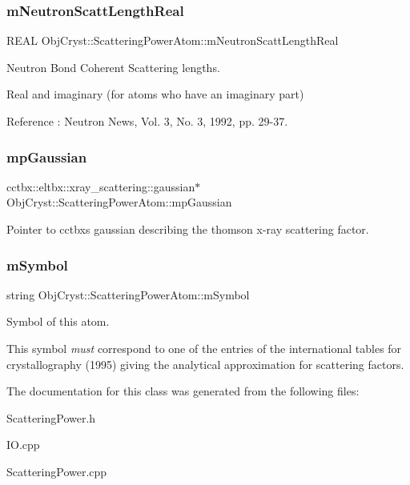 \subsubsection{\texorpdfstring{mNeutronScattLengthReal}{mNeutronScattLengthReal}}
{\footnotesize\ttfamily R\+E\+AL Obj\+Cryst\+::\+Scattering\+Power\+Atom\+::m\+Neutron\+Scatt\+Length\+Real\hspace{0.3cm}{\ttfamily [protected]}}



Neutron Bond Coherent Scattering lengths. 

Real and imaginary (for atoms who have an imaginary part)

Reference \+: Neutron News, Vol. 3, No. 3, 1992, pp. 29-\/37. \mbox{\label{class_obj_cryst_1_1_scattering_power_atom_af5837e83fd8027adcaecde3a5fbb22f2}} 
\subsubsection{\texorpdfstring{mpGaussian}{mpGaussian}}
{\footnotesize\ttfamily cctbx\+::eltbx\+::xray\+\_\+scattering\+::gaussian$\ast$ Obj\+Cryst\+::\+Scattering\+Power\+Atom\+::mp\+Gaussian\hspace{0.3cm}{\ttfamily [protected]}}

Pointer to cctbx\textquotesingle{}s gaussian describing the thomson x-\/ray scattering factor. \mbox{\label{class_obj_cryst_1_1_scattering_power_atom_a8716898711ea10436334ec4a970c32a6}} 
\subsubsection{\texorpdfstring{mSymbol}{mSymbol}}
{\footnotesize\ttfamily string Obj\+Cryst\+::\+Scattering\+Power\+Atom\+::m\+Symbol\hspace{0.3cm}{\ttfamily [protected]}}



Symbol of this atom. 

This symbol {\itshape must} correspond to one of the entries of the international tables for crystallography (1995) giving the analytical approximation for scattering factors. 

The documentation for this class was generated from the following files\+:\begin{DoxyCompactItemize}
\item 
Scattering\+Power.\+h\item 
I\+O.\+cpp\item 
Scattering\+Power.\+cpp\end{DoxyCompactItemize}
